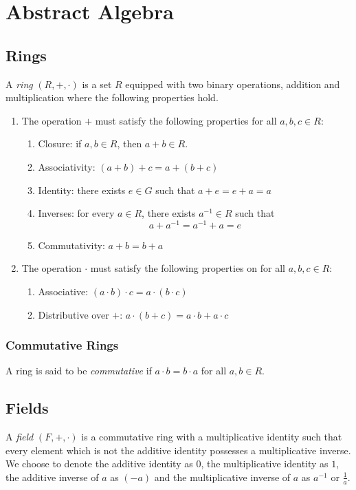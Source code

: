 \chapter{Abstract Algebra}

\section{Rings}

A \emph{ring} $(R,+,\cdot)$ is a set $R$ equipped with two binary operations, addition and multiplication 
where the following properties hold.

\begin{enumerate}
    \item
		The operation $+$ must satisfy the following properties for all $a,b,c\in R$:
			\begin{enumerate}
		    \item Closure: if $a,b\in R$, then $a+b\in R$.
		    \item Associativity: $(a+b)+c=a+(b+c)$ 
		    \item Identity: there exists $e\in G$ such that $a+e=e+a=a$
		    \item Inverses: for every $a\in R$, there exists $a^{-1}\in R$ such that
		    \[
		    a+a^{-1}=a^{-1}+a=e
		    \]
		    \item Commutativity: $a+b=b+a$ 
			\end{enumerate}
    \item The operation $\cdot$ must satisfy the following properties on for all $a,b,c\in R$:
	\begin{enumerate}
	\item Associative: $(a \cdot b) \cdot c=a\cdot (b \cdot c)$
    \item Distributive over $+$: $a\cdot(b+c)=a\cdot b+a\cdot c$
	\end{enumerate}
\end{enumerate}

\subsection*{Commutative Rings}
A ring is said to be \emph{commutative} if $a\cdot b=b\cdot a$ for all $a,b\in R$.

\section{Fields}

A \emph{field} $(F,+,\cdot)$ is a commutative ring with a multiplicative identity such that 
every element which is not the additive identity possesses a multiplicative inverse. We choose to denote 
the additive identity as $0$, the multiplicative identity as $1$, the additive inverse of $a$ as $(-a)$ and 
the multiplicative inverse of $a$ as $a^{-1}$ or $\frac{1}{a}$.

